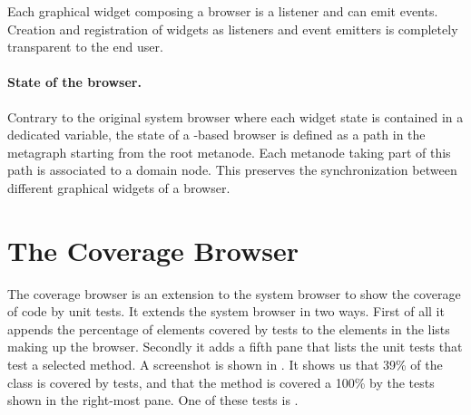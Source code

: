 \documentclass[a4paper,10pt,twoside]{book}
\begin{document}
Each graphical widget composing a browser is a listener and can emit events. Creation and registration of widgets as listeners and event emitters is completely transparent to the end user.

\paragraph{State of the browser.} Contrary to the original \pharo system browser where each widget state is contained in a dedicated variable, the state of a \obf-based browser is defined as a path in the metagraph starting from the root metanode. Each metanode taking part of this path is associated to a domain node. This preserves the synchronization between different graphical widgets of a browser.


\section{The Coverage Browser}\label{sec:coverageBrowser}

The coverage browser is an extension to the system browser to show the coverage of code by unit tests.
It extends the system browser in two ways.
First of all it appends the percentage of elements covered by tests to the elements in the lists making up the browser. Secondly it adds a fifth pane that lists the unit tests that test a selected method. 
A screenshot is shown in .
It shows us that 39\% of the class  is covered by tests, and that the method  is covered a 100\% by the tests shown in the right-most pane. One of these tests is .
\end{document}
